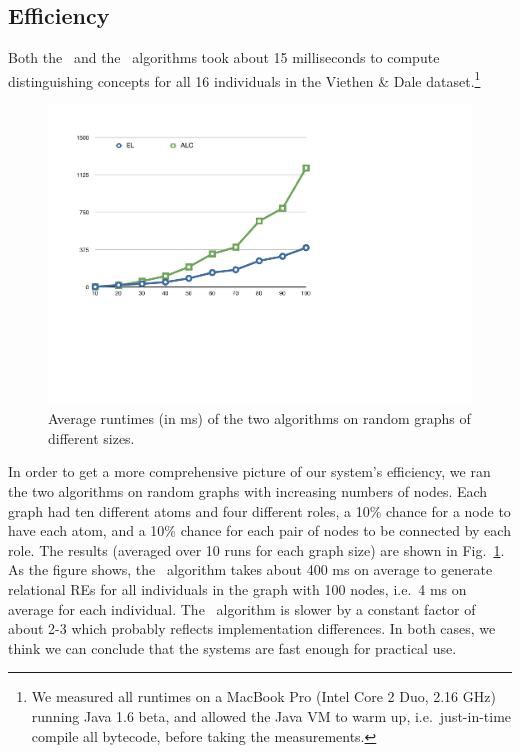 



\subsection{Efficiency}

Both the \el\ and the \alc\ algorithms took about 15 milliseconds to
compute distinguishing concepts for all 16 individuals in the Viethen
\& Dale dataset.\footnote{We measured all runtimes on a MacBook Pro
  (Intel Core 2 Duo, 2.16 GHz) running Java 1.6 beta, and allowed the
  Java VM to warm up, i.e.\ just-in-time compile all bytecode, before
  taking the measurements.}

\begin{figure}
  \centering
  \includegraphics[width=\columnwidth]{runtimes}
  \caption{Average runtimes (in ms) of the two algorithms on random graphs of
    different sizes.} 
  \label{fig:runtimes}
\end{figure}

In order to get a more comprehensive picture of our system's
efficiency, we ran the two algorithms on random graphs with increasing
numbers of nodes.   Each graph had ten different atoms and four
different roles, a 10\% chance for a node to have each atom, and a
10\% chance for each pair of nodes to be connected by each role.  The
results (averaged over 10 runs for each graph size) are shown in
Fig.~\ref{fig:runtimes}.  As the figure shows, the \el\ algorithm
takes about 400 ms on average to generate relational REs for all
individuals in the graph with 100 nodes, i.e.\ 4 ms on average for
each individual.  The \alc\ algorithm is slower by a constant factor
of about 2-3 which probably reflects implementation differences.  In
both cases, we think we can conclude that the systems are fast enough
for practical use.



